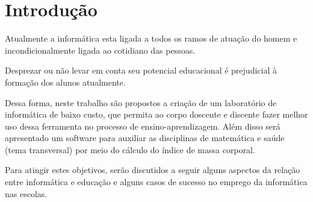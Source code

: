 \chapter*{Introdução}
\label{ch:intro}
Atualmente a informática esta ligada a todos os ramos de atuação do homem e
incondicionalmente ligada ao cotidiano das pessoas.

Desprezar ou não levar em conta seu potencial educacional é prejudicial à
formação dos alunos atualmente.

Dessa forma, neste trabalho são propostos a criação de um laboratório de
informática de baixo custo, que permita ao corpo doscente e discente fazer
melhor uso dessa ferramenta no processo de ensino-aprendizagem. Além disso
será apresentado um software para auxiliar as disciplinas de matemática e
saúde (tema transversal) por meio do cálculo do índice de massa corporal.

Para atingir estes objetivos, serão discutidos a seguir alguns aspectos da
relação entre informática e educação e alguns casos de sucesso no emprego
da informática nas escolas.
